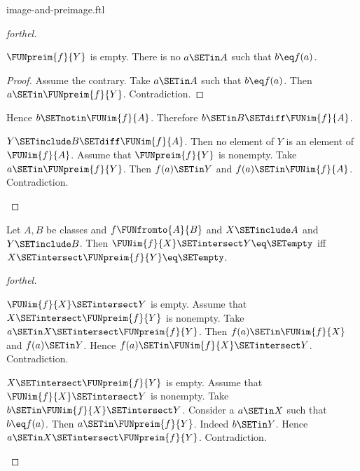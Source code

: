 \documentclass{naproche-library}
\begin{document}
\begin{smodule}[title=Computation Laws for Images and Preimages]{image-and-preimage.ftl}
\begin{proof}[forthel]
\begin{case}{$\FUNpreim{f}{Y}$ is empty.}
    There is no $a \SETin A$ such that $b \eq f(a)$.
    \begin{proof}
      Assume the contrary.
      Take $a \SETin A$ such that $b \eq f(a)$.
      Then $a \SETin \FUNpreim{f}{Y}$.
      Contradiction.
    \end{proof}

    Hence $b \SETnotin \FUNim{f}{A}$.
    Therefore $b \SETin B \SETdiff \FUNim{f}{A}$.
  \end{case}

  \begin{case}{$Y \SETinclude B \SETdiff \FUNim{f}{A}$.}
    Then no element of $Y$ is an element of $\FUNim{f}{A}$.
    Assume that $\FUNpreim{f}{Y}$ is nonempty.
    Take $a \SETin \FUNpreim{f}{Y}$.
    Then $f(a) \SETin Y$ and $f(a) \SETin \FUNim{f}{A}$.
    Contradiction.
  \end{case}
\end{proof}

\begin{proposition}[forthel,id=FOUNDATIONS_07_6295504988143616]
  Let $A, B$ be classes and $f \FUNfromto{A}{B}$ and $X \SETinclude A$ and $Y \SETinclude B$.
  Then $\FUNim{f}{X} \SETintersect Y \eq \SETempty$ iff $X \SETintersect \FUNpreim{f}{Y} \eq \SETempty$.
\end{proposition}
\begin{proof}[forthel]
  \begin{case}{$\FUNim{f}{X} \SETintersect Y$ is empty.}
    Assume that $X \SETintersect \FUNpreim{f}{Y}$ is nonempty.
    Take $a \SETin X \SETintersect \FUNpreim{f}{Y}$.
    Then $f(a) \SETin \FUNim{f}{X}$ and $f(a) \SETin Y$.
    Hence $f(a) \SETin \FUNim{f}{X} \SETintersect Y$.
    Contradiction.
  \end{case}

  \begin{case}{$X \SETintersect \FUNpreim{f}{Y}$ is empty.}
    Assume that $\FUNim{f}{X} \SETintersect Y$ is nonempty.
    Take $b \SETin \FUNim{f}{X} \SETintersect Y$.
    Consider a $a \SETin X$ such that $b \eq f(a)$.
    Then $a \SETin \FUNpreim{f}{Y}$.
    Indeed $b \SETin Y$.
    Hence $a \SETin X \SETintersect \FUNpreim{f}{Y}$.
    Contradiction.
  \end{case}
\end{proof}


\end{smodule}
\end{document}
